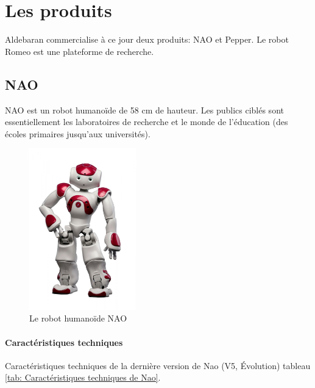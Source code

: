 \section{Les produits}
\label{Entreprise: Les produits}
Aldebaran commercialise à ce jour deux produits: NAO et Pepper. Le robot Romeo est une plateforme de recherche.

\subsection{NAO}
\label{Entreprise: Les produits: Nao}
NAO est un robot humanoïde de 58 cm de hauteur. Les publics ciblés sont essentiellement les laboratoires de recherche et le monde de l'éducation (des écoles primaires jusqu'aux universités).

\begin{figure}[H]
	\centering\includegraphics[height=7cm]{images/nao.jpg}
	\caption{Le robot humanoïde NAO}
	\label{fig:Robot humanoïde Nao}
\end{figure}

\paragraph{Caractéristiques techniques}
\label{Entreprise:Les produits: Nao: Caractéristiques techniques}
Caractéristiques techniques de la dernière version de Nao (V5, Évolution) tableau \ref{tab: Caractéristiques techniques de Nao}.

